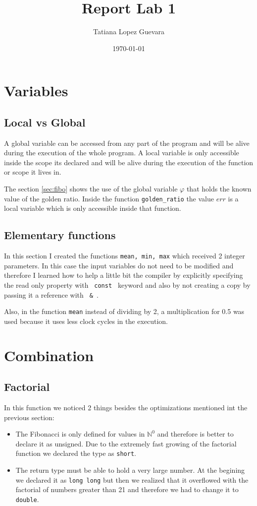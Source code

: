 \documentclass{article}
\begin{document}
\title{Report Lab 1}
\date {\today}
\author{Tatiana Lopez Guevara}
\maketitle


\section{Variables}
\subsection{Local vs Global}
A global variable can be accessed from any part of the program and will 
be alive during the execution of the whole program.
A local variable is only accessible inside the scope its 
declared and will be alive during the execution of the function or scope it lives in.

The section \ref{sec:fibo} shows the use of the global variable $\varphi$ that holds 
the known value of the golden ratio. Inside the function \verb|golden_ratio| 
the value $err$ is a local variable which is only accessible inside that function.

\subsection{Elementary functions}
In this section I created the functions \verb|mean, min, max| which received 2 
integer parameters. In this case the input variables do not need to be modified
and therefore I learned how to help a little bit the compiler by explicitly 
specifying the read only property with \verb+ const + keyword and also by not 
creating a copy by passing it a reference with \verb+ & +. 

Also, in the function \verb+mean+ instead of dividing by 2, a multiplication
for 0.5 was used because it uses less clock cycles in the execution.

\section{Combination}
\subsection{Factorial}
In this function we noticed 2 things besides the optimizations mentioned 
int the previous section:
\begin{itemize}
\item The Fibonacci is only defined for values in $\mathbb{N}^0$ and therefore
is better to declare it as unsigned. Due to the extremely fast growing of the
factorial function we declared the type as \verb+short+.
\item The return type must be able to hold a very large number. At the begining
we declared it as \verb+long long+ but then we realized that it overflowed with
the factorial of numbers greater than 21 and therefore we had to change it to
\verb+double+.
\end{itemize}
\end{document}
